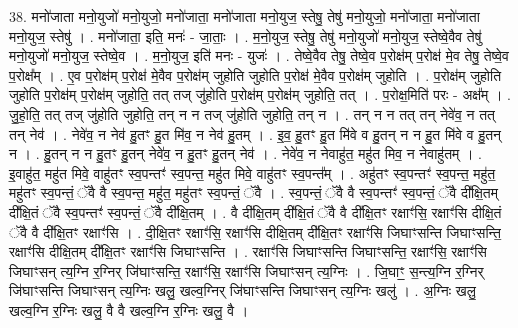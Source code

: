 \documentclass[17pt]{extarticle}
\begin{document}
38. मनो॑जाता मनो॒युजो॑ मनो॒युजो॒ मनो॑जाता॒ मनो॑जाता मनो॒युज॒ स्तेषु॒ तेषु॑ मनो॒युजो॒ मनो॑जाता॒ मनो॑जाता मनो॒युज॒ स्तेषु॑ । . मनो॑जाता॒ इति॒ मनः॑ - जा॒ताः॒ । . म॒नो॒युज॒ स्तेषु॒ तेषु॑ मनो॒युजो॑ मनो॒युज॒ स्तेष्वे॒वैव तेषु॑ मनो॒युजो॑ मनो॒युज॒ स्तेष्वे॒व । . म॒नो॒युज॒ इति॑ मनः - युजः॑ । . तेष्वे॒वैव तेषु॒ तेष्वे॒व प॒रोक्ष॑म् प॒रोक्ष॑ मे॒व तेषु॒ तेष्वे॒व प॒रोक्ष᳚म् । . ए॒व प॒रोक्ष॑म् प॒रोक्ष॑ मे॒वैव प॒रोक्ष॑म् जुहोति जुहोति प॒रोक्ष॑ मे॒वैव प॒रोक्ष॑म् जुहोति । . प॒रोक्ष॑म् जुहोति जुहोति प॒रोक्ष॑म् प॒रोक्ष॑म् जुहोति॒ तत् तज् जु॑होति प॒रोक्ष॑म् प॒रोक्ष॑म् जुहोति॒ तत् । . प॒रोक्ष॒मिति॑ परः - अक्ष᳚म् । . जु॒हो॒ति॒ तत् तज् जु॑होति जुहोति॒ तन् न न तज् जु॑होति जुहोति॒ तन् न । . तन् न न तत् तन् नेवे॑व॒ न तत् तन् नेव॑ । . नेवे॑व॒ न नेव॑ हु॒तꣳ हु॒त मि॑व॒ न नेव॑ हु॒तम् । . इ॒व॒ हु॒तꣳ हु॒त मि॑वे व हु॒तन् न न हु॒त मि॑वे व हु॒तन् न । . हु॒तन् न न हु॒तꣳ हु॒तन् नेवे॑व॒ न हु॒तꣳ हु॒तन् नेव॑ । . नेवे॑व॒ न नेवाहु॑त॒ महु॑त मिव॒ न नेवाहु॑तम् । . इ॒वाहु॑त॒ महु॑त मिवे॒ वाहु॑तꣳ स्व॒पन्तꣳ॑ स्व॒पन्त॒ महु॑त मिवे॒ वाहु॑तꣳ स्व॒पन्त᳚म् । . अहु॑तꣳ स्व॒पन्तꣳ॑ स्व॒पन्त॒ महु॑त॒ महु॑तꣳ स्व॒पन्तं॒ ॅवै वै स्व॒पन्त॒ महु॑त॒ महु॑तꣳ स्व॒पन्तं॒ ॅवै । . स्व॒पन्तं॒ ॅवै वै स्व॒पन्तꣳ॑ स्व॒पन्तं॒ ॅवै दी᳚क्षि॒तम् दी᳚क्षि॒तं ॅवै स्व॒पन्तꣳ॑ स्व॒पन्तं॒ ॅवै दी᳚क्षि॒तम् । . वै दी᳚क्षि॒तम् दी᳚क्षि॒तं ॅवै वै दी᳚क्षि॒तꣳ रक्षाꣳ॑सि॒ रक्षाꣳ॑सि दीक्षि॒तं ॅवै वै दी᳚क्षि॒तꣳ रक्षाꣳ॑सि । . दी॒क्षि॒तꣳ रक्षाꣳ॑सि॒ रक्षाꣳ॑सि दीक्षि॒तम् दी᳚क्षि॒तꣳ रक्षाꣳ॑सि जिघाꣳसन्ति जिघाꣳसन्ति॒ रक्षाꣳ॑सि दीक्षि॒तम् दी᳚क्षि॒तꣳ रक्षाꣳ॑सि जिघाꣳसन्ति । . रक्षाꣳ॑सि जिघाꣳसन्ति जिघाꣳसन्ति॒ रक्षाꣳ॑सि॒ रक्षाꣳ॑सि जिघाꣳसन् त्य॒ग्नि र॒ग्निर् जि॑घाꣳसन्ति॒ रक्षाꣳ॑सि॒ रक्षाꣳ॑सि जिघाꣳसन् त्य॒ग्निः । . जि॒घाꣳ॒॒ स॒न्त्य॒ग्नि र॒ग्निर् जि॑घाꣳसन्ति जिघाꣳसन् त्य॒ग्निः खलु॒ खल्व॒ग्निर् जि॑घाꣳसन्ति जिघाꣳसन् त्य॒ग्निः खलु॑ । . अ॒ग्निः खलु॒ खल्व॒ग्नि र॒ग्निः खलु॒ वै वै खल्व॒ग्नि र॒ग्निः खलु॒ वै । \newline
\pagebreak
{}
\end{document}
